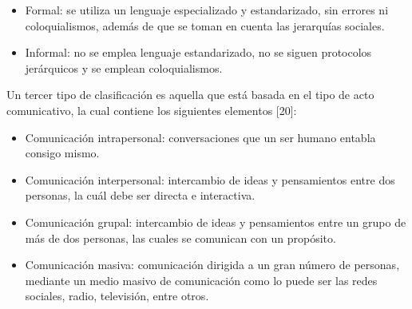 \begin{itemize}

\item Formal: se utiliza un lenguaje especializado y estandarizado, sin errores ni coloquialismos, además de que se toman en cuenta las jerarquías sociales.
\item Informal: no se emplea lenguaje estandarizado, no se siguen protocolos jerárquicos y se emplean coloquialismos.
\end{itemize}
Un tercer tipo de clasificación es aquella que está basada en el tipo de acto comunicativo, la cual contiene los siguientes elementos [20]:
\begin{itemize}
\item Comunicación intrapersonal: conversaciones que un ser humano entabla consigo mismo.
\item Comunicación interpersonal: intercambio de ideas y pensamientos entre dos personas, la cuál debe ser directa e interactiva.
\item Comunicación grupal: intercambio de ideas y pensamientos entre un grupo de más de dos personas, las cuales se comunican con un propósito.
\item Comunicación masiva: comunicación dirigida a un gran número de personas, mediante un medio masivo de comunicación como lo puede ser las redes sociales, radio, televisión, entre otros.
\end{itemize}

